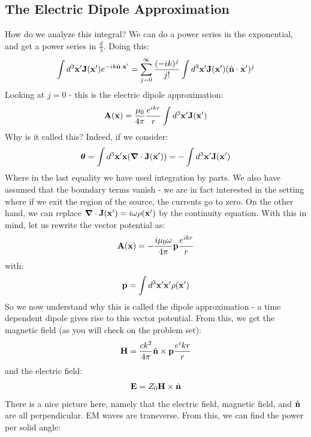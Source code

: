 \subsection{The Electric Dipole Approximation}
How do we analyze this integral? We can do a power series in the exponential, and get a power series in $\frac{d}{\lambda}$. Doing this:
\begin{equation}
    \int d^3\mathbf{x}' \mathbf{J}(\mathbf{x}')e^{-ik\hat{\mathbf{n}}\cdot\mathbf{x}'} = \sum_{j=0}^\infty \frac{(-ik)^j}{j!}\int d^3\mathbf{x}' \mathbf{J}(\mathbf{x}')(\hat{\mathbf{n}} \cdot \mathbf{x}')^j
\end{equation}
Looking at $j = 0$ - this is the electric dipole approximation:
\begin{equation}
    \mathbf{A}(\mathbf{x}) = \frac{\mu_0}{4\pi}\frac{e^{ikr}}{r}\int d^3\mathbf{x}'\mathbf{J}(\mathbf{x}')
\end{equation}
Why is it called this? Indeed, if we consider:
\begin{equation}
    \gv{\theta} = \int d^3\v{x}' \v{x}(\nabla \cdot \v{J}(\v{x}')) = -\int d^3\v{x}' \v{J}(\v{x}')
\end{equation}
Where in the last equality we have used integration by parts. We also have assumed that the boundary terms vanish - we are in fact interested in the setting where if we exit the region of the source, the currents go to zero. On the other hand, we can replace $\nabla \cdot \v{J}(\v{x}') = i\omega \rho(\v{x}')$ by the continuity equation. With this in mind, let us rewrite the vector potential as:
\begin{equation}
    \mathbf{A}(\mathbf{x}) = -\frac{i\mu_0\omega}{4\pi}\mathbf{p}\frac{e^{ikr}}{r}
\end{equation}
with:
\begin{equation}
    \mathbf{p} = \int d^3\mathbf{x}' \mathbf{x}'\rho(\mathbf{x}')
\end{equation}
So we now understand why this is called the dipole approximation - a time dependent dipole gives rise to this vector potential. From this, we get the magnetic field (as you will check on the problem set):
\begin{equation}
    \mathbf{H} = \frac{ck^2}{4\pi}\hat{\mathbf{n}} \times \mathbf{p}\frac{e{^ikr}}{r}
\end{equation}
and the electric field:
\begin{equation}
    \mathbf{E} = Z_0\mathbf{H} \times \hat{\mathbf{n}}
\end{equation}
There is a nice picture here, namely that the electric field, magnetic field, and $\hat{\mathbf{n}}$ are all perpendicular. EM waves are transverse. From this, we can find the power per solid angle:

